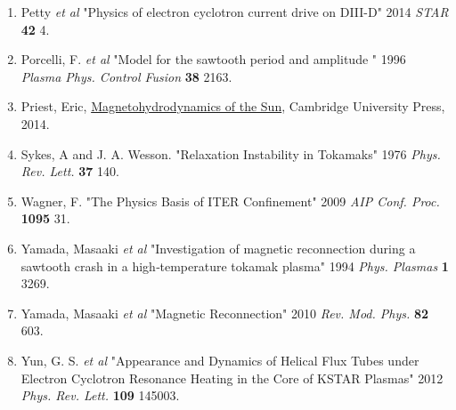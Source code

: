 \documentclass{article}
\begin{document}
\begin{enumerate}
\item Petty \textit{et al} "Physics of electron cyclotron current drive on DIII-D" 2014 \textit{STAR} \textbf{42} 4.
\item Porcelli, F. \textit{et al} "Model for the sawtooth period and amplitude
" 1996 \textit{Plasma Phys. Control Fusion} \textbf{38} 2163.
\item Priest, Eric,  \underline{Magnetohydrodynamics of the Sun},  Cambridge University Press, 2014.
\item Sykes, A and J. A. Wesson.  "Relaxation Instability in Tokamaks" 1976 \textit{Phys. Rev. Lett.} \textbf{37} 140.
\item Wagner, F. "The Physics Basis of ITER Confinement" 2009 \textit{AIP Conf. Proc.} \textbf{1095} 31.
\item Yamada, Masaaki \textit{et al} "Investigation of magnetic reconnection during a sawtooth crash in a high‐temperature tokamak plasma" 1994 \textit{Phys. Plasmas} \textbf{1} 3269.
\item Yamada, Masaaki \textit{et al} "Magnetic Reconnection" 2010 \textit{Rev. Mod. Phys.} \textbf{82} 603.
\item Yun, G. S. \textit{et al} "Appearance and Dynamics of Helical Flux Tubes under Electron Cyclotron Resonance Heating in the Core of KSTAR Plasmas" 2012 \textit{Phys. Rev. Lett.} \textbf{109} 145003.
\end{enumerate}
\end{document}
